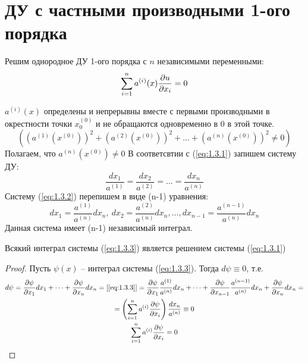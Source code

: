 \documentclass[../main.tex]{subfiles}
\begin{document}
\section{ДУ с частными производными 1-ого порядка}
Решим однородное ДУ 1-ого порядка с $n$ независимыми переменными:
\begin{equation}
    \label{eq:1.3.1}
    \sum_{i=1}^n a^{(i)}(x)\frac{\partial u}{\partial x_i} = 0
\end{equation}

$a^{(i)}(x)$ определены и непрерывны вместе с первыми производными в
окрестности точки $x_0^{(0)}$ и не обращаются одновременно в $0$ в этой точке.
\[
\left((a^{(1)}(x^{(0)}))^2 + (a^{(2)}(x^{(0)}))^2 + \dots + (a^{(n)}(x^{(0)}))^2 \neq 0\right)
\]
Полагаем, что $a^{(n)}(x^{(0)})\neq 0$
В соответсвтии с (\ref*{eq:1.3.1}) запишем систему ДУ:
\begin{equation}
    \label{eq:1.3.2}
    \frac{dx_1}{a^{(1)}} = \frac{dx_2}{a^{(2)}} = \dots = \frac{dx_n}{a^{(n)}}
\end{equation}
Систему (\ref*{eq:1.3.2}) перепишем в виде (n-1) уравнения:
\begin{equation}
    \label{eq:1.3.3}
    dx_1 = \frac{a^{(1)}}{a^{(n)}}dx_n, \:
    dx_2 = \frac{a^{(2)}}{a^{(n)}}dx_n, 
    \dots,
    dx_{n-1} = \frac{a^{(n-1)}}{a^{(n)}}dx_n   
\end{equation}
Данная система имеет (n-1) независимый интеграл.
\begin{theorem}
    Всякий интеграл системы (\ref*{eq:1.3.3}) является решением системы (\ref*{eq:1.3.1})
\end{theorem}
\begin{proof}
    Пусть $\psi(x)$ -- интеграл системы (\ref*{eq:1.3.3}). Тогда $d\psi \equiv 0$,
    т.е.
    \begin{gather*}
        d\psi = \pderiv{\psi}{x_1}dx_1 + \dots + \pderiv{\psi}{x_n}dx_n = [\ref*{eq:1.3.3}] = 
        \pderiv{\psi}{x_1}\frac{a^{(1)}}{a^{(n)}}dx_n + \dots 
        + \pderiv{\psi}{x_{n-1}}\frac{a^{(n-1)}}{a^{(n)}}dx_n + \pderiv{\psi}{x_n}dx_n = \\
        = \left(\sum_{i=1}^{n}a^{(i)}\pderiv{\psi}{x_i}\right)\frac{dx_n}{a^{(n)}} \equiv 0\\
        \sum_{i=1}^{n}a^{(i)}\pderiv{\psi}{x_i} = 0
    \end{gather*}
\end{proof}
\end{document}
